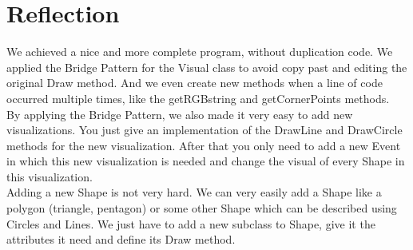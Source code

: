 \documentclass[a4paper,12pt]{article}
\begin{document}
\section{Reflection}
We achieved a nice and more complete program, without duplication code. We applied the Bridge Pattern for the Visual class to avoid copy past and editing the original Draw method. And we even create new methods when a line of code occurred multiple times, like the getRGBstring and getCornerPoints methods.
\\
By applying the Bridge Pattern, we also made it very easy to add new visualizations. You just give an implementation of the DrawLine and DrawCircle methods for the new visualization. After that you only need to add a new Event in which this new visualization is needed and change the visual of every Shape in this visualization.
\\
Adding a new Shape is not very hard. We can very easily add a Shape like a polygon (triangle, pentagon) or some other Shape which can be described using Circles and Lines. We just have to add a new subclass to Shape, give it the attributes it need and define its Draw method.
\end{document}
